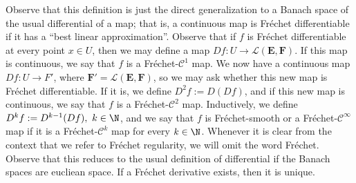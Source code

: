 Observe that this definition is just the direct generalization to a Banach space of the usual differential of a map; that is, a continuous map is Fréchet differentiable if it has a ``best linear approximation''. Observe that if \(f\) is Fréchet differentiable at every point \(x \in U\), then we may define a map \(Df\colon U \to \mathcal{L}(\mathbf{E},\mathbf{F})\). If this map is continuous, we say that \(f\) is a Fréchet-\(\mathscr{C}^1\) map. We now have a continuous map \(Df\colon U \to F'\), where \(\mathbf{F}'=\mathcal{L}(\mathbf{E},\mathbf{F})\), so we may ask whether this new map is Fréchet differentiable. If it is, we define \(D^2f:=D(Df)\), and if this new map is continuous, we say that \(f\) is a Fréchet-\(\mathscr{C}^2\) map. Inductively, we define \(D^kf:=D^{k-1}(Df), \ k \in \N\), and we say that \(f\) is Fréchet-smooth or a Fréchet-\(\mathscr{C}^\infty\) map if it is a Fréchet-\(\mathscr{C}^k\) map for every \(k \in \N\). Whenever it is clear from the context that we refer to Fréchet regularity, we will omit the word Fréchet. Observe that this reduces to the usual definition of differential if the Banach spaces are eucliean space. If a Fréchet derivative exists, then it is unique.

